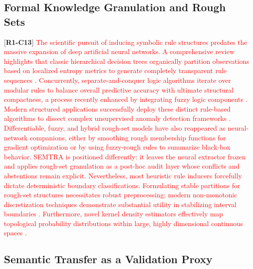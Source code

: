 \documentclass[make,article,submit,pdftex,moreauthors]{Definitions/mdpi}
\newcommand{\revtag}[2]{[\textbf{R#1-C#2}]}
\newcommand{\Rone}[1]{\textcolor{red}{#1}}
\begin{document}
\subsection{Formal Knowledge Granulation and Rough Sets}
\label{subsec:symbolic_rule_extraction}

\revtag{1}{13} \Rone{The scientific pursuit of inducing symbolic rule structures predates the massive expansion of deep artificial neural networks. A comprehensive review highlights that classic hierarchical decision trees organically partition observations based on localized entropy metrics to generate completely transparent rule sequences \cite{Mienye2024DecisionTrees}. Concurrently, separate-and-conquer logic algorithms iterate over modular rules to balance overall predictive accuracy with ultimate structural compactness, a process recently enhanced by integrating fuzzy logic components \cite{Bollaert2024FRRI}. Modern structured applications successfully deploy these distinct rule-based algorithms to dissect complex unsupervised anomaly detection frameworks \cite{Zhang2024DissectBlackBox}. Differentiable, fuzzy, and hybrid rough-set models have also reappeared as neural-network companions, either by smoothing rough membership functions for gradient optimization or by using fuzzy-rough rules to summarize black-box behavior. SEMTRA is positioned differently: it leaves the neural extractor frozen and applies rough-set granulation as a post-hoc audit layer whose conflicts and abstentions remain explicit. Nevertheless, most heuristic rule inducers forcefully dictate deterministic boundary classifications. Formulating stable partitions for rough-set structures necessitates robust preprocessing; modern non-monotonic discretization techniques demonstrate substantial utility in stabilizing interval boundaries \cite{SenozanSoylu2024Discretization}. Furthermore, novel kernel density estimators effectively map topological probability distributions within large, highly dimensional continuous spaces \cite{Biroli2026KDEHighDim}.}

\subsection{Semantic Transfer as a Validation Proxy}
\label{subsec:semantic_transfer}
\end{document}
